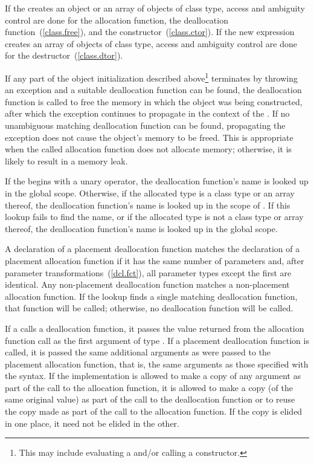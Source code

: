 \pnum
If the  creates an object or an array of
objects of class type, access and ambiguity control are done for the
allocation function, the deallocation function~(\ref{class.free}), and
the constructor~(\ref{class.ctor}). If the new expression creates an
array of objects of class type, access and ambiguity control are done
for the destructor~(\ref{class.dtor}).

\pnum
{}%
If any part of the object initialization described above\footnote{This may
include evaluating a  and/or calling
a constructor.}
terminates by throwing an exception and a suitable deallocation function
can be found, the deallocation function is called to free the memory in
which the object was being constructed, after which the exception
continues to propagate in the context of the .
If no unambiguous matching deallocation function can be found,
propagating the exception does not cause the object's memory to be
freed.
\enternote 
This is appropriate when the called allocation function does not
allocate memory; otherwise, it is likely to result in a memory leak.
\exitnote 

\pnum
If the  begins with a unary \tcode{::}
operator, the deallocation function's name is looked up in the global
scope. Otherwise, if the allocated type is a class type  or an
array thereof, the deallocation function's name is looked up in the
scope of . If this lookup fails to find the name, or if the
allocated type is not a class type or array thereof, the deallocation
function's name is looked up in the global scope.

\pnum
A declaration of a placement deallocation function matches the
declaration of a placement allocation function if it has the same number
of parameters and, after parameter transformations~(\ref{dcl.fct}), all
parameter types except the first are identical. Any non-placement
deallocation function matches a non-placement allocation function. If
the lookup finds a single matching deallocation function, that function
will be called; otherwise, no deallocation function will be called.

\pnum
If a  calls a deallocation function, it passes
the value returned from the allocation function call as the first
argument of type . If a placement deallocation function is
called, it is passed the same additional arguments as were passed to the
placement allocation function, that is, the same arguments as those
specified with the  syntax. If the
implementation is allowed to make a copy of any argument as part of the
call to the allocation function, it is allowed to make a copy (of the
same original value) as part of the call to the deallocation function or
to reuse the copy made as part of the call to the allocation function.
If the copy is elided in one place, it need not be elided in the other.

